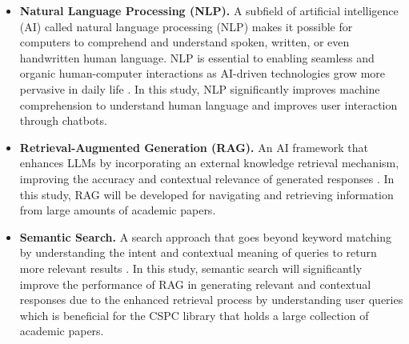 \begin{refsection}
\begin{itemize}
    \item \textbf{Natural Language Processing (NLP).} A subfield of artificial intelligence (AI) called natural language processing (NLP) makes it possible for computers to comprehend and understand spoken, written, or even handwritten human language. NLP is essential to enabling seamless and organic human-computer interactions as AI-driven technologies grow more pervasive in daily life \cite{ramirez2024natural}. In this study, NLP significantly improves machine comprehension to understand human language and improves user interaction through chatbots.
    \item \textbf{Retrieval-Augmented Generation (RAG).} An AI framework that enhances LLMs by incorporating an external knowledge retrieval mechanism, improving the accuracy and contextual relevance of generated responses \cite{lewis2020retrieval}. In this study, RAG will be developed for navigating and retrieving information from large amounts of academic papers.
    \item \textbf{Semantic Search.} A search approach that goes beyond keyword matching by understanding the intent and contextual meaning of queries to return more relevant results \cite{mahboub2024evaluation}. In this study, semantic search will significantly improve the performance of RAG in generating relevant and contextual responses due to the enhanced retrieval process by understanding user queries which is beneficial for the CSPC library that holds a large collection of academic papers.
\end{itemize}

\clearpage

\printbibliography[heading=subbibintoc, title={\centering Notes}]
\end{refsection}